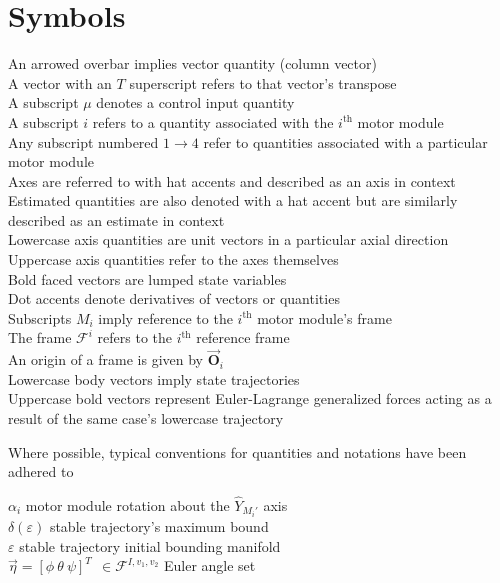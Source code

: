 \documentclass[a4paper, 11pt, oneside, openright, parskip=full]{book}
\begin{document}
\chapter{Symbols}
\label{ch:symbol}
An arrowed overbar implies vector quantity (column vector)\\
A vector with an $T$ superscript refers to that vector's transpose\\
A subscript $\mu$ denotes a control input quantity\\
A subscript $i$ refers to a quantity associated with the $i^{\text{th}}$ motor module\\
Any subscript numbered $1\rightarrow 4$ refer to quantities associated with a particular motor module\\
Axes are referred to with hat accents and described as an axis in context\\
Estimated quantities are also denoted with a hat accent but are similarly described as an estimate in context\\
Lowercase axis quantities are unit vectors in a particular axial direction\\
Uppercase axis quantities refer to the axes themselves\\
Bold faced vectors are lumped state variables\\
Dot accents denote derivatives of vectors or quantities\\
Subscripts $M_i$ imply reference to the $i^{\text{th}}$ motor module's frame\\
The frame $\mathcal{F}^i$ refers to the $i^{\text{th}}$ reference frame\\
An origin of a frame is given by $\vec{\mathbf{O}}_i$\\
Lowercase body vectors imply state trajectories\\
Uppercase bold vectors represent Euler-Lagrange generalized forces acting as a result of the same case's lowercase trajectory
\par
Where possible, typical conventions for quantities and notations have been adhered to
\par
$\alpha_i$ motor module rotation about the $\hat{Y}_{M_i'}$ axis\\
$\delta (\varepsilon)$ stable trajectory's maximum bound\\
$\varepsilon$ stable trajectory initial bounding manifold\\
$\vec{\eta}=[\phi~\theta~\psi]^T~~\in\mathcal{F}^{I,v_1,v_2}$ Euler angle set\\
\end{document}
